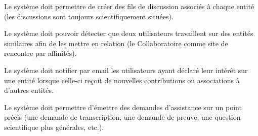 \startchapter[title={Instruments sociaux}]

\exig{}
Le système doit permettre de créer des fils de discussion associés à chaque entité (les discussions sont toujours scientifiquement situées).

\exig{}
Le système doit pouvoir détecter que deux utilisateurs travaillent sur des entités similaires afin de les mettre en relation (le Collaboratoire comme site de rencontre par affinités).

\exig{}
Le système doit notifier par email les utilisateurs ayant déclaré leur intérêt sur une entité lorsque celle-ci reçoit de nouvelles contributions ou associations à d'autres entités.

\exig{}
Le système doit permettre d'émettre des demandes d'assistance sur un point précis (une demande de transcription, une demande de preuve, une question scientifique plus générales, etc.).